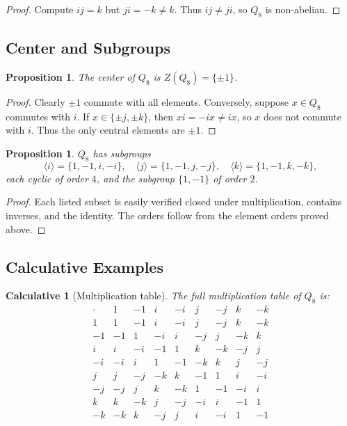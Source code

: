 \documentclass[12pt]{article}
\newtheorem{proposition}[theorem]{Proposition}
\newtheorem{calculative}[theorem]{Calculative}
\theoremstyle{definition}
\begin{document}
\begin{proof}
Compute $ij=k$ but $ji=-k\neq k$. Thus $ij\neq ji$, so $Q_8$ is non-abelian.
\end{proof}

\subsection*{Center and Subgroups}
\begin{proposition}
The center of $Q_8$ is $Z(Q_8)=\{\pm 1\}$.
\end{proposition}

\begin{proof}
Clearly $\pm 1$ commute with all elements. Conversely, suppose $x\in Q_8$ commutes with $i$.  
If $x\in\{\pm j,\pm k\}$, then $xi=-ix\neq ix$, so $x$ does not commute with $i$.  
Thus the only central elements are $\pm 1$.
\end{proof}

\begin{proposition}
$Q_8$ has subgroups
\[
\langle i\rangle=\{1,-1,i,-i\},\quad
\langle j\rangle=\{1,-1,j,-j\},\quad
\langle k\rangle=\{1,-1,k,-k\},
\]
each cyclic of order $4$, and the subgroup $\{1,-1\}$ of order $2$.
\end{proposition}

\begin{proof}
Each listed subset is easily verified closed under multiplication, contains inverses, and the identity.
The orders follow from the element orders proved above.
\end{proof}

\subsection*{Calculative Examples}

\begin{calculative}[Multiplication table]
The full multiplication table of $Q_8$ is:
\[
\begin{array}{c|rrrrrrrr}
\cdot & 1 & -1 & i & -i & j & -j & k & -k \\
\hline
1 & 1 & -1 & i & -i & j & -j & k & -k \\
-1 & -1 & 1 & -i & i & -j & j & -k & k \\
i & i & -i & -1 & 1 & k & -k & -j & j \\
-i & -i & i & 1 & -1 & -k & k & j & -j \\
j & j & -j & -k & k & -1 & 1 & i & -i \\
-j & -j & j & k & -k & 1 & -1 & -i & i \\
k & k & -k & j & -j & -i & i & -1 & 1 \\
-k & -k & k & -j & j & i & -i & 1 & -1
\end{array}
\]
\end{calculative}
\end{document}
